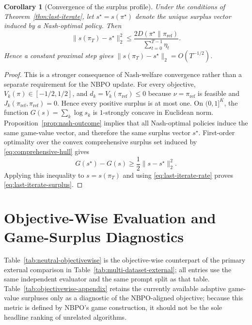 \documentclass{article}
\newtheorem{corollary}{Corollary}
\theoremstyle{remark}
\theoremstyle{plain}
\newcommand{\piref}{\pi_{\mathrm{ref}}}
\begin{document}
\begin{corollary}[Convergence of the surplus profile]
\label{cor:surplus-convergence}
Under the conditions of Theorem~\ref{thm:last-iterate}, let
$s^\star=s(\pi^\star)$ denote the unique surplus vector induced by a
Nash-optimal policy. Then
\begin{equation}
\|s(\pi_T)-s^\star\|_2^2
\le
\frac{2D(\pi^\star\|\piref)}
{\sum_{t=0}^{T-1}\eta_t}.
\label{eq:last-iterate-surplus}
\end{equation}
Hence a constant proximal step gives
$\|s(\pi_T)-s^\star\|_2=O(T^{-1/2})$.
\end{corollary}

\begin{proof}
This is a stronger consequence of Nash-welfare convergence rather than a
separate requirement for the NBPO update. For every objective,
$V_k(\pi)\in[-1/2,1/2]$, and
$d_k=V_k(\piref)\le0$ because $\nu=\piref$ is feasible and
$J_k(\piref,\piref)=0$. Hence every positive surplus is at most one. On
$(0,1]^K$, the function
$G(s)=\sum_k\log s_k$ is $1$-strongly concave in Euclidean norm.
Proposition~\ref{prop:nash-outcome} implies that all Nash-optimal policies induce the
same game-value vector, and therefore the same surplus vector $s^\star$.
First-order optimality over the convex comprehensive surplus set induced by
\eqref{eq:comprehensive-hull} gives
\begin{equation}
G(s^\star)-G(s)
\ge
\frac12\|s-s^\star\|_2^2.
\label{eq:surplus-strong-concavity}
\end{equation}
Applying this inequality to $s=s(\pi_T)$ and using
\eqref{eq:last-iterate-rate} proves \eqref{eq:last-iterate-surplus}.
\end{proof}

\section{Objective-Wise Evaluation and Game-Surplus Diagnostics}
\label{app:objectivewise}
Table~\ref{tab:neutral-objectivewise} is the objective-wise counterpart of the primary external comparison in Table~\ref{tab:multi-dataset-external}; all entries use the same independent evaluator and the same prompt split as that table. Table~\ref{tab:objectivewise-appendix} retains the currently available adaptive game-value surpluses only as a diagnostic of the NBPO-aligned objective; because this metric is defined by NBPO's game construction, it should not be the sole headline ranking of unrelated algorithms.
\end{document}

